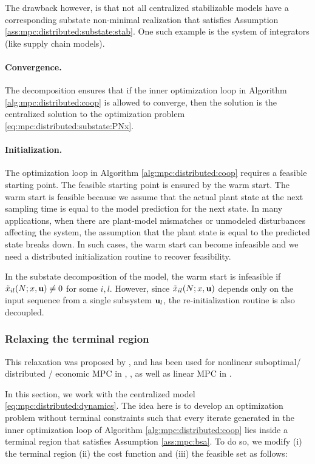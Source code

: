 The drawback however, is that not all centralized stabilizable models
have a corresponding substate non-minimal realization that satisfies
Assumption \ref{ass:mpc:distributed:substate:stab}. One such example is the system of
integrators (like supply chain models).

\paragraph{Convergence.} The decomposition ensures that if the inner
optimization loop in Algorithm \ref{alg:mpc:distributed:coop} is allowed to converge,
then the solution is the centralized solution to the optimization
problem \eqref{eq:mpc:distributed:substate:PNx}.

\paragraph{Initialization.} The optimization loop in Algorithm
\ref{alg:mpc:distributed:coop} requires a feasible starting point. The feasible
starting point is ensured by the warm start. The warm start
is feasible because we assume that the actual plant state at the next
sampling time is equal to the model prediction for the next state. In
many applications, when there are plant-model mismatches or unmodeled
disturbances affecting the system, the assumption that the plant
state is equal to the predicted state  breaks down. In such cases,
the warm start can become infeasible and we need a distributed
initialization routine to recover feasibility.

In the substate decomposition of the model, the warm start is
infeasible if $\tilde{x}_{il}(N;x,\mathbf{u}) \neq 0$ for some
$i,l$. However, since $\tilde{x}_{il}(N;x,\mathbf{u})$  depends only on the
input sequence from a single subsystem $\mathbf{u}_l$, the re-initialization
routine is also decoupled. 

\subsubsection{Relaxing the terminal region}
\label{sec:mpc:distributed:relaxation}
This relaxation was proposed by
\citet{rawlings:stewart:wright:mayne:2010}, and has been used for
nonlinear suboptimal/ distributed / economic  MPC in
\citet{stewart:wright:rawlings:2011},
\citet{pannocchia:rawlings:wright:2011},
\citet{amrit:rawlings:angeli:2011} as well as linear MPC in
\citet{subramanian:rawlings:maravelias:2012}.

In this section, we work with the  centralized model
\eqref{eq:mpc:distributed:dynamics}. The idea here is to develop an optimization problem
without terminal constraints such that every  iterate generated
in the inner optimization loop of Algorithm \ref{alg:mpc:distributed:coop} lies inside
a terminal region that satisfies Assumption \ref{ass:mpc:bsa}. To do so,
we modify (i) the terminal region (ii) the cost function and (iii) the
feasible set as follows:

